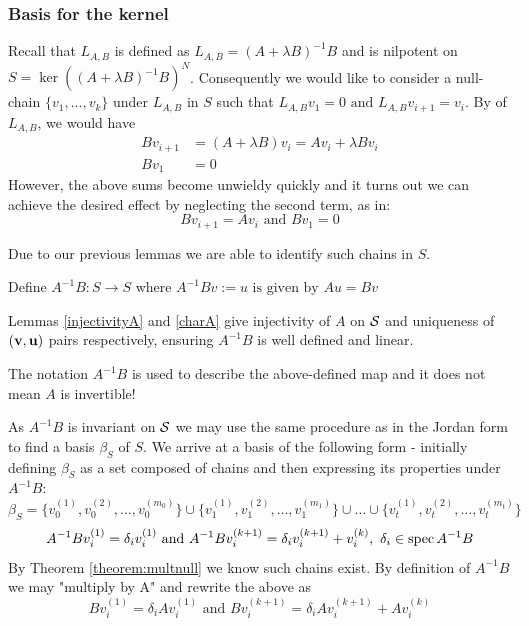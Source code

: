 \subsubsection{Basis for the kernel }\label{basisS}
Recall that $L_{A,B}$ is defined as $L_{A,B}=(A+\lambda B)^{-1}B$ and is nilpotent on
$S=\ker((A+\lambda B)^{-1}B)^N$.
Consequently we would like to consider a null-chain $\{v_1,...,v_k\}$ under $L_{A,B}$ in $S$ such that $L_{A,B}v_1=0\text{ and }  L_{A,B}v_{i+1}=v_i $. By 
of $L_{A,B}$, we would have
\begin{align*}
   Bv_{i+1}&=(A+\lambda B)v_i=Av_i+\lambda Bv_i\label{18}\\
   Bv_1&=0
\end{align*}
However, the above sums become unwieldy quickly and it turns out we can achieve the desired effect by neglecting the second term, as in: 
\begin{equation}\label{chainAB}
    Bv_{i+1}=Av_i\text{ and }Bv_1=0
\end{equation}

Due to our previous lemmas we are able to identify such chains in $S$.

Define $A^{-1}B:S\rightarrow S$ where  
$A^{-1}Bv:=u \text{ is given by }Au=Bv$

Lemmas \ref{injectivityA} and \ref{charA} give injectivity of \(A\) on \(\mathcal{S}\) and uniqueness of \((\mathbf{v},\mathbf{u})\) pairs respectively, ensuring \(A^{-1}B\) is well defined and linear.

\begin{remark}
    The notation $A^{-1}B$ is used to describe the above-defined map and it does not mean $A$ is invertible!
\end{remark}
\newpage
As \(A^{-1}B\) is invariant on \(\mathcal{S}\) we may use the same procedure as in the Jordan form to find a basis \(\beta_S\) of \(S\).
We arrive at a basis of the following form - initially defining $\beta_S$ as a set composed of chains and then expressing its properties under $A^{-1}B$: 
\begin{equation}
\beta_S=\{v_{0}^{(1)},v_{0}^{(2)},\dots,v_{0}^{(m_0)}\} \cup \{v_{1}^{(1)},v_{1}^{(2)},\dots,v_{1}^{(m_1)}\} \cup \dots \cup \{v_{t}^{(1)},v_{t}^{(2)},\dots,v_{t}^{(m_t)}\} \tag{\(\star\)} \label{eq:vbasis}
 \end{equation}
\begin{equation}
    A^{-1}Bv_{i}^{(1)}=\delta_i v_{i}^{(1)} \text{ and } A^{-1}Bv_{i}^{(k+1)}=\delta_i v_{i}^{(k+1)}+v_{i}^{(k)}, \ \delta_i \in \spec A^{-1}B
\end{equation}
By Theorem \ref{theorem:multnull} we know such chains exist. By definition of $A^{-1}B$ we may "multiply by A" and rewrite the above as 
\begin{equation}\label{BAdel0}
   Bv_{i}^{(1)}=\delta_iA v_{i}^{(1)} \text{ and } Bv_{i}^{(k+1)}=\delta_iA v_{i}^{(k+1)}+Av_{i}^{(k)}
\end{equation}


